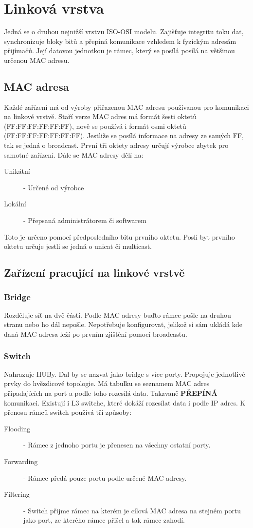 \section{Linková vrstva}
\label{sec:linkova-vrstva}
Jedná se o druhou nejnižší vrstvu ISO-OSI modelu.
Zajišťuje integritu toku dat, synchronizuje bloky bitů a přepíná komunikace vzhledem k fyzickým adresám přijímačů.
Její datovou jednotkou je rámec, který se posílá posílá na většinou určenou MAC adresu.
\subsection{MAC adresa}
Každé zařízení má od výroby přiřazenou MAC adresu používanou pro komunikaci na linkové vrstvě.
Staří verze MAC adres má formát šesti oktetů (FF:FF:FF:FF:FF:FF), nově se používá i formát osmi oktetů (FF:FF:FF:FF:FF:FF:FF).
Jestliže se posílá informace na adresy ze samých FF, tak se jedná o broadcast.
První tři oktety adresy určují výrobce zbytek pro samotné zařízení.
Dále se MAC adresy dělí na:
\begin{description}
  \item[Unikátní]- Určené od výrobce
  \item[Lokální]- Přepsaná administrátorem či softwarem
\end{description}
Toto je určeno pomocí předposledního bitu prvního oktetu.
Poslí byt prvního oktetu určuje jestli se jedná o unicat či multicast.
\subsection{Zařízení pracující na linkové vrstvě}
\subsubsection{Bridge}
Rozděluje síť na dvě části.
Podle MAC adresy buďto rámec pošle na druhou stranu nebo ho dál nepošle.
Nepotřebuje konfigurovat, jelikož si sám ukládá kde daná MAC adresa leží po prvním zjištění pomocí broadcastu.
\subsubsection{Switch}
\label{subsubsec:switch}
Nahrazuje HUBy.
Dal by se nazvat jako bridge s více porty.
Propojuje jednotlivé prvky do hvězdicové topologie.
Má tabulku se seznamem MAC adres připadajících na port a podle toho rozesílá data.
Takzvaně \textbf{PŘEPÍNÁ} komunikaci.
Existují i L3 switche, které dokáží rozesílat data i podle IP adres.
K přenosu rámců switch používá tři způsoby:
\begin{description}
  \item[Flooding]- Rámec z jednoho portu je přenesen na všechny ostatní porty.
  \item[Forwarding]- Rámec předá pouze portu podle určené MAC adresy.
  \item[Filtering]- Switch přijme rámec na kterém je cílová MAC adresa na stejném portu jako port, ze kterého rámec přišel a tak rámec zahodí.   
\end{description}
